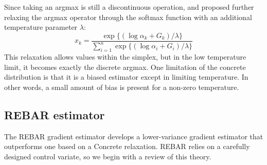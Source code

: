 \documentclass{article}
\begin{document}
Since taking an argmax is still a discontinuous operation, \cite{maddison2016concrete} and \cite{jang2016categorical} proposed further relaxing the argmax operator through the softmax function with an additional temperature parameter $\lambda$:
\begin{equation}
x_k = \frac{\exp\{( \log \alpha_k+ G_k) / \lambda\}}{\sum_{i=1}^n\exp\{( \log \alpha_i+ G_i) / \lambda\}}
\end{equation}
This relaxation allows values within the simplex, but in the low temperature limit, it becomes exactly the discrete argmax.
One limitation of the concrete distribution is that it is a biased estimator except in limiting temperature.
In other words, a small amount of bias is present for a non-zero temperature.



\subsection{REBAR estimator}

The REBAR gradient estimator develops a lower-variance gradient estimator that outperforms one based on a Concrete relaxation. REBAR relies on a carefully designed control variate, so we begin with a review of this theory.
\end{document}
